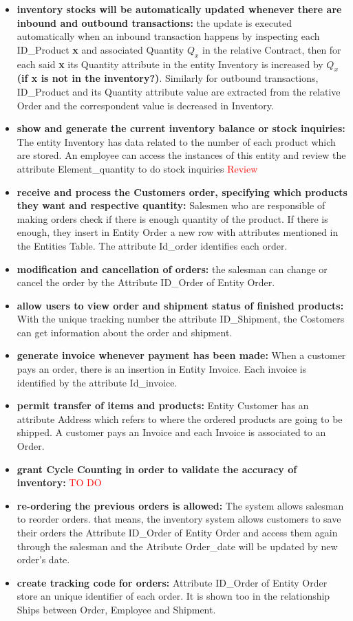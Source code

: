 \begin{itemize}
\item \textbf{inventory stocks will be automatically updated whenever there are inbound and outbound transactions:} the update is executed automatically when an inbound transaction happens by inspecting each ID\_Product \textbf{x} and associated Quantity \(Q_x\) in the relative Contract, then for each said \textbf{x} its Quantity attribute in the entity Inventory is increased by  \(Q_x\) \textbf{(if x is not in the inventory?)}. Similarly for outbound transactions, ID\_Product and its Quantity attribute value are extracted from the relative Order and the correspondent value is decreased in Inventory.
    \item \textbf{show and generate the current inventory balance or stock inquiries:} The entity Inventory has data related to the number of each product which are stored. An employee can access the instances of this entity and review the attribute Element\_quantity to do stock inquiries \textcolor{Red}{Review} 
    \item \textbf{receive and process the Customers order, specifying which products they want and respective quantity:} Salesmen who are responsible of making orders check if there is enough quantity of the product. If there is enough, they insert in Entity Order a new row with attributes mentioned in the Entities Table. The attribute Id\_order identifies each order.
    \item \textbf{modification and cancellation of orders:} the salesman can change or cancel the order by the Attribute ID\_Order of Entity Order.
    \item \textbf{allow users to view order and shipment status of finished products:} With the unique tracking number the attribute ID\_Shipment, the Costomers can get information about the order and shipment.
    \item \textbf{generate invoice whenever payment has been made:} When a customer pays an order, there is an insertion in  Entity Invoice. Each invoice is identified by the attribute Id\_invoice.
    \item \textbf{permit transfer of items and products:} Entity Customer has an attribute Address which refers to where the ordered products are going to be shipped. A customer pays an Invoice and each Invoice is associated to an Order.
    \item \textbf{grant Cycle Counting in order to validate the accuracy of inventory:} \textcolor{Red}{TO DO}
    \item \textbf{re-ordering the previous orders is allowed:} The system allows salesman to reorder orders. that means, the inventory system allows customers to save their orders the Attribute ID\_Order of Entity Order and access them again through the salesman and the Atribute Order\_date will be updated by new order's date.
    \item \textbf{create tracking code for orders:} Attribute ID\_Order of Entity Order store an unique identifier of each order. It is shown too in the relationship Ships between Order, Employee and Shipment.
\end{itemize}




